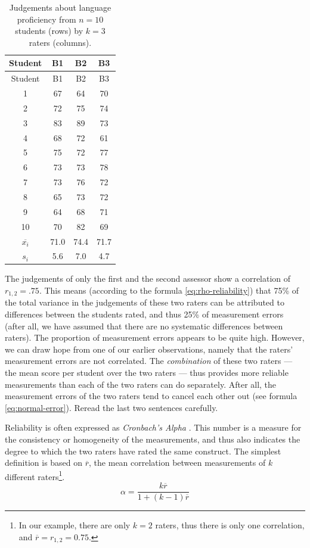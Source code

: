 \documentclass[
]{book}
\begin{document}
\begin{longtable}[]{@{}cccc@{}}
\caption{\label{tab:reliability} Judgements about language proficiency
from \(n = 10\) students (rows) by \(k = 3\) raters (columns).}\tabularnewline
\toprule
Student & B1 & B2 & B3 \\
\midrule
\endfirsthead
\toprule
Student & B1 & B2 & B3 \\
\midrule
\endhead
1 & 67 & 64 & 70 \\
2 & 72 & 75 & 74 \\
3 & 83 & 89 & 73 \\
4 & 68 & 72 & 61 \\
5 & 75 & 72 & 77 \\
6 & 73 & 73 & 78 \\
7 & 73 & 76 & 72 \\
8 & 65 & 73 & 72 \\
9 & 64 & 68 & 71 \\
10 & 70 & 82 & 69 \\
\(\overline{x_i}\) & 71.0 & 74.4 & 71.7 \\
\(s_i\) & 5.6 & 7.0 & 4.7 \\
\bottomrule
\end{longtable}

The judgements of only the first and the second assessor show a
correlation of \(r_{1,2}=.75\). This means (according to the formula
\eqref{eq:rho-reliability}) that 75\% of the total variance in the
judgements of these two raters can be attributed to differences
between the students rated, and thus 25\% of measurement errors (after all,
we have assumed that there are no systematic differences between
raters). The proportion of measurement errors appears to be quite high.
However, we can draw hope from one of our earlier observations, namely that
the raters' measurement errors are not correlated. The
\emph{combination} of these two raters --- the mean score per student
over the two raters --- thus provides more reliable measurements
than each of the two raters can do separately. After all, the
measurement errors of the two raters tend to cancel each other out
(see formula \eqref{eq:normal-error}).
Reread the last two sentences carefully.

Reliability is often expressed as \emph{Cronbach's Alpha}
\citep{Cort93}. This number is a measure for the consistency or homogeneity
of the measurements, and thus also indicates the degree to which the two
raters have rated the same construct. The simplest definition is
based on \(\overline{r}\), the mean correlation between
measurements of \(k\) different raters\footnote{In our example, there are only \(k=2\) raters, thus there is only one
  correlation, and \(\overline{r} = r_{1,2} = 0.75\).}.
\begin{equation}
  \label{eq:cronbach-corr}
  \alpha = \frac{k \overline{r}} {1+(k-1)\overline{r}}
\end{equation}
\end{document}
